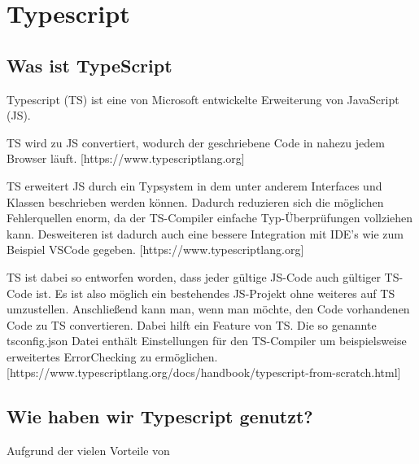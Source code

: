 \section{Typescript}

\subsection{Was ist TypeScript}

Typescript (TS) ist eine von Microsoft entwickelte Erweiterung von JavaScript (JS). \cite{typescriptlang}

TS wird zu JS convertiert, wodurch der geschriebene Code in nahezu jedem Browser läuft.
[https://www.typescriptlang.org]

TS erweitert JS durch ein Typsystem in dem unter anderem Interfaces und Klassen beschrieben werden können. Dadurch reduzieren sich die möglichen Fehlerquellen enorm, da der TS-Compiler einfache Typ-Überprüfungen vollziehen kann. Desweiteren ist dadurch auch eine bessere Integration mit IDE's wie zum Beispiel VSCode gegeben.
[https://www.typescriptlang.org]

TS ist dabei so entworfen worden, dass jeder gültige JS-Code auch gültiger TS-Code ist. Es ist also möglich ein bestehendes JS-Projekt ohne weiteres auf TS umzustellen. Anschließend kann man, wenn man möchte, den Code vorhandenen Code zu TS convertieren. Dabei hilft ein Feature von TS. Die so genannte tsconfig.json Datei enthält Einstellungen für den TS-Compiler um beispielsweise erweitertes ErrorChecking zu ermöglichen. [https://www.typescriptlang.org/docs/handbook/typescript-from-scratch.html]

\subsection{Wie haben wir Typescript genutzt?}

Aufgrund der vielen Vorteile von 
